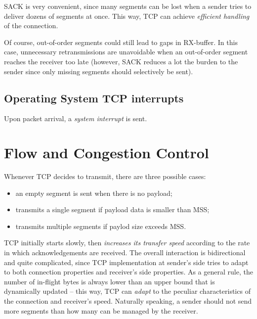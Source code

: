 \documentclass[a4paper, 11pt]{report}
\begin{document}
SACK is very convenient, since many segments can be lost when a sender tries to
deliver dozens of segments at once. This way, TCP can achieve \emph{efficient
handling} of the connection.

Of course, out-of-order segments could still lead to gaps in RX-buffer. In this
case, unnecessary retransmissions are unavoidable when an out-of-order segment
reaches the receiver too late (however, SACK reduces a lot the burden to the
sender since only missing segments should selectively be sent).

\section{Operating System TCP interrupts}

Upon packet arrival, a \emph{system interrupt} is sent. 

\chapter{Flow and Congestion Control}

Whenever TCP decides to transmit, there are three possible cases: 
\begin{itemize}
	\item an empty segment is sent when there is no payload;
	\item transmits a single segment if payload data is smaller than MSS;
	\item transmits multiple segments if paylod size exceeds MSS.
\end{itemize}

TCP initially starts slowly, then \emph{increases its transfer speed} according
to the rate in which acknowledgements are received. The overall interaction is
bidirectional and quite complicated, since TCP implementation at sender's side
tries to adapt to both connection properties and receiver's side properties.
As a general rule, the number of in-flight bytes is always lower than an upper
bound that is dynamically updated \--- this way, TCP can \emph{adapt} to the
peculiar characteristics of the connection and receiver's speed. Naturally
speaking, a sender should not send more segments than how many can be managed
by the receiver.
\end{document}
